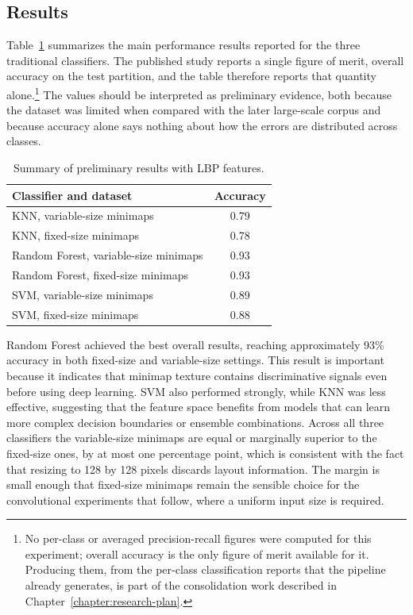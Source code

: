 \subsection{Results}

Table~\ref{tab:study1-results} summarizes the main performance results reported
for the three traditional classifiers. The published study reports a single
figure of merit, overall accuracy on the test partition, and the table therefore
reports that quantity alone.\footnote{No per-class or averaged precision-recall
figures were computed for this experiment; overall accuracy is the only figure
of merit available for it. Producing them, from the per-class classification
reports that the pipeline already generates, is part of the consolidation work
described in Chapter~\ref{chapter:research-plan}.} The values should be interpreted as
preliminary evidence, both because the dataset was limited when compared with
the later large-scale corpus and because accuracy alone says nothing about how
the errors are distributed across classes.

\begin{table}[ht]
\centering
\caption{Summary of preliminary results with LBP features.}
\label{tab:study1-results}
\begin{tabular}{p{}c}
\toprule
\textbf{Classifier and dataset} & \textbf{Accuracy} \\
\midrule
KNN, variable-size minimaps & 0.79 \\
KNN, fixed-size minimaps & 0.78 \\
Random Forest, variable-size minimaps & 0.93 \\
Random Forest, fixed-size minimaps & 0.93 \\
SVM, variable-size minimaps & 0.89 \\
SVM, fixed-size minimaps & 0.88 \\
\bottomrule
\end{tabular}
\fautor
\end{table}

Random Forest achieved the best overall results, reaching approximately 93\%
accuracy in both fixed-size and variable-size settings. This result is
important because it indicates that minimap texture contains discriminative
signals even before using deep learning. SVM also performed strongly, while KNN
was less effective, suggesting that the feature space benefits from models that
can learn more complex decision boundaries or ensemble combinations. Across all
three classifiers the variable-size minimaps are equal or marginally superior to
the fixed-size ones, by at most one percentage point, which is consistent with
the fact that resizing to 128 by 128 pixels discards layout information. The
margin is small enough that fixed-size minimaps remain the sensible choice for
the convolutional experiments that follow, where a uniform input size is
required.

